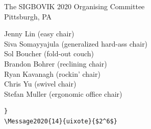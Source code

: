\documentclass[12pt]{article}
\begin{document}
\begin{flushright}
The SIGBOVIK 2020 Organising Committee\\
Pittsburgh, PA

Jenny Lin (easy chair)\\
Siva Somayyajula (generalized hard-ass chair)\\
Sol Boucher (fold-out couch)\\
Brandon Bohrer (reclining chair)\\
Ryan Kavanagh (rockin' chair)\\
Chris Yu (swivel chair)\\
Stefan Muller (ergonomic office chair)
\end{flushright}
\begin{verbatim}
}
\Message2020{14}{uixote}{$2^6$}
\end{verbatim}



\thispagestyle{empty}
\end{document}
